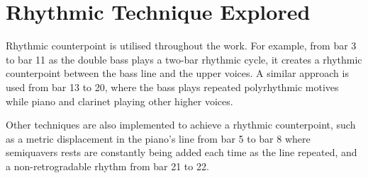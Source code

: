 \documentclass[a4paper]{article}
\begin{document}
\section{Rhythmic Technique Explored}
Rhythmic counterpoint is utilised throughout the work. For example, from bar 3 to bar 11 as the double bass plays a two-bar rhythmic cycle, it creates a rhythmic counterpoint between the bass line and the upper voices. A similar approach is used from bar 13 to 20, where the bass plays repeated polyrhythmic motives while piano and clarinet playing other higher voices.\par
Other techniques are also implemented to achieve a rhythmic counterpoint, such as a metric displacement in the piano's line from bar 5 to bar 8 where semiquavers rests are constantly being added each time as the line repeated, and a non-retrogradable rhythm from bar 21 to 22.
\end{document}
